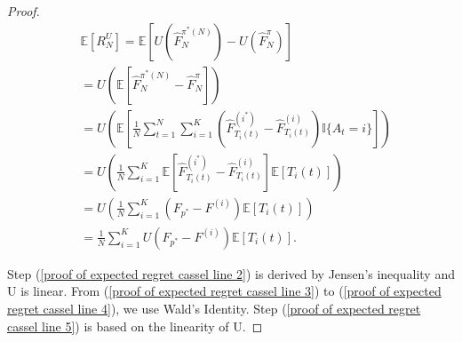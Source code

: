 \begin{proof}
\begingroup
\allowdisplaybreaks
\begin{align}
    &\mathbb{E}[R_N^{U}] =\mathbb{E}\left[U\left(\hat{F}_{N}^{\pi^{*}(N)}\right)-U\left(\hat{F}_{N}^{\pi}\right)\right]\\
\label{proof of expected regret cassel line 2}
     &=U\left(\mathbb{E}\left[\hat{F}_{N}^{\pi^{*}(N)}-\hat{F}_{N}^{\pi}\right]\right) \\
\label{proof of expected regret cassel line 3}
     &= U\left(\mathbb{E}\left[\frac{1}{N} \sum_{t=1}^{N} \sum_{i = 1}^{K} \left(\hat{F}_{T_i(t)}^{(i^\ast)} - \hat{F}_{T_i(t)}^{(i)} \right) \mathbb{I}\{A_t = i\}\right]\right)\\
\label{proof of expected regret cassel line 4}
     &= U\left(\frac{1}{N} \sum_{i = 1}^{K} \mathbb{E}\left[\hat{F}_{T_i(t)}^{(i^\ast)} - \hat{F}_{T_i(t)}^{(i)} \right] \mathbb{E}\left[T_i(t)\right]\right)\\
\label{proof of expected regret cassel line 5}
     &= U\left(\frac{1}{N} \sum_{i = 1}^{K} \left(F_{p^\ast} - F^{(i)}\right) \mathbb{E}\left[T_i(t)\right]\right)\\
     &=\frac{1}{N} \sum_{i = 1}^{K}  U\left(F_{p^\ast} - F^{(i)}\right) \mathbb{E}\left[T_i(t)\right].
\end{align}

Step (\ref{proof of expected regret cassel line 2}) is derived by Jensen's inequality and U is linear. From (\ref{proof of expected regret cassel line 3}) to (\ref{proof of expected regret cassel line 4}), we use Wald's Identity. Step (\ref{proof of expected regret cassel line 5}) is based on the linearity of U.


\end{proof}
